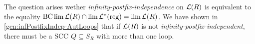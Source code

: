 

%
%


The question arises wether \emph{infinity-postfix-independence} on $\mathcal{L}(R)$ is equivalent to the equality $\operatorname{BC} \lim \mathcal{L}(R) \cap \lim \mathcal{L}^*(\textup{\textrm{reg}}) = \lim \mathcal{L}(R)$. We have shown in \cref{gen:infPostfixIndep-AutLoops} that if $\mathcal{L}(R)$ is not \emph{infinity-postfix-independent}, there must be a SCC $Q \subseteq S_R$ with more than one loop.

